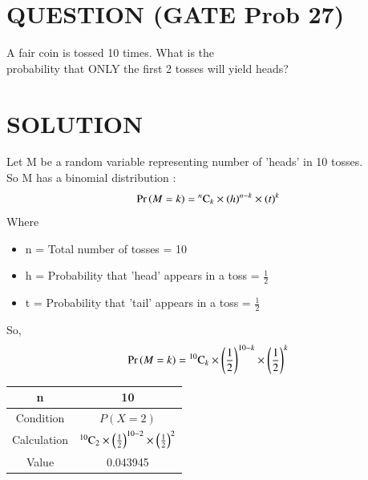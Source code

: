 \documentclass[journal,12pt,twocolumn]{IEEEtran}
\begin{document}
\section*{QUESTION (GATE Prob 27)}
A fair coin is tossed 10 times. What is the \\probability that ONLY the first 2 tosses will yield heads?
\section*{SOLUTION}
Let M be a random variable representing number of 'heads' in 10 tosses.\\
So M has a binomial distribution :
\begin{align}
    \Pr\left(M=k\right) = {}^{n}\mathrm{C}_{k} \times (h)^{n-k} \times (t)^{k}\label{0.0.1}
\end{align}
Where
\begin{itemize}
    \item n = Total number of tosses = 10
    \item h = Probability that 'head' appears in a toss = \( \frac{1}{2} \)
    \item t = Probability that 'tail' appears in a toss = \( \frac{1}{2} \)
\end{itemize}
\bigskip
So,
\begin{align}
    \Pr\left(M=k\right) = {}^{10}\mathrm{C}_{k} \times \left(\frac{1}{2}\right)^{10-k} \times \left(\frac{1}{2}\right)^{k}\label{0.0.2}
\end{align}
\begin{table}[h]
    \begin{center}
        \resizebox{7cm}{!}
        {
            \begin{tabular}{|c|c|}
                \hline
                n           & 10                                                                            \\
                \hline
                Condition   & $P(X = 2)$                                                                    \\
                \hline
                Calculation & ${}^{10}\mathrm{C}_{2} \times \left(\frac{1}{2}\right)^{10-2} \times \left(\frac{1}{2}\right)^{2}$ \\
                \hline
                Value       & 0.043945                                                                      \\
                \hline
            \end{tabular}
        }
    \end{center}
\end{table}
\end{document}
